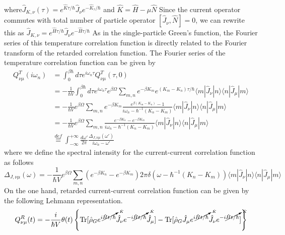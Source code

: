 where$\hat J_{K,\nu}(\tau)=e^{\hat{K}\tau/\hbar}\hat J_\nu e^{-\hat{K}_\tau/\hbar}$
and $\hat K=\hat H-\mu \hat N$
 Since the current operator commutes with total number of particle operator $[\hat J_\nu,\hat N]=0$, we can rewrite this as $\hat J_{K,\nu}=e^{\hat H\tau/\hbar}\hat J_\nu e^{-\hat H\tau/\hbar}$
 As in the single-particle Green's function, the Fourier series of this temperature correlation function is directly related to the Fourier transform of the retarded correlation function.
 The Fourier series of the temperature correlation function can be given by
\begin{equation}\label{eq4.8.19}
\begin{aligned}
Q^T_{\nu\mu}(i\omega_n)&=\int_0^{\beta\hbar} d\tau e^{i\omega_n \tau} Q^T_{\nu\mu}(\tau,0)\\
&=-\frac{1}{\hbar V} \int_0^{\beta\hbar} d\tau e^{i\omega_n \tau} e^{\beta\Omega} \sum_{m,n} e^{-\beta K_m} e^{(K_m-K_n)\tau/\hbar} \langle m|\hat J_\nu|n\rangle \langle n| \hat J_\mu|m\rangle\\
&=-\frac{1}{\hbar V} e^{\beta\Omega} \sum_{m,n} e^{-\beta K_m} \frac{e^{\beta(K_m-K_n)}-1}{i\omega_n-\hbar^{-1}(K_n-K_m)} \langle m|\hat J_\nu|n\rangle \langle n| \hat J_\mu|m\rangle\\
&=-\frac{1}{\hbar V} e^{\beta\Omega} \sum_{m,n} \frac{e^{-\beta K_n}-e^{-\beta K_m}}{i\omega_n-\hbar^{-1}(K_n-K_m)} \langle m|\hat J_\nu|n\rangle \langle n| \hat J_\mu|m\rangle\\
&\overset{def}{\equiv} \int_{-\infty}^{+\infty}\frac{d\omega'}{2\pi} \frac{\Delta_{J,\nu\mu}(\omega')}{i\omega_n-\omega'}
\end{aligned}
\end{equation}
where we define the spectral intensity for the current-current correlation function as follows
\begin{equation}
\Delta_{J,\nu\mu}(\omega)=-\frac{1}{\hbar V} e^{\beta\Omega} \sum_{m,n} \left( e^{-\beta K_n}-e^{-\beta K_m} \right) 2\pi \delta(\omega-\hbar^{-1}(K_n-K_m)) \langle m|\hat J_\nu|n\rangle \langle n| \hat J_\mu|m\rangle
\end{equation}
 On the one hand, retarded current-current correlation function can be given by the following Lehmann representation.
\begin{equation}
Q^R_{\nu\mu}(t)=-\frac{i}{\hbar V} \theta(t) \left\{ \text{Tr}[\hat \rho_G e^{i\cancelto{\hat K}{\hat Ht/\hbar}} \hat J_\nu e^{-i\cancelto{\hat K}{\hat Ht/\hbar}} \hat J_\mu]- \text{Tr}[\hat \rho_G \hat J_\mu e^{i\cancelto{\hat K}{\hat Ht/\hbar}} \hat J_\nu e^{-i\cancelto{\hat K}{\hat Ht/\hbar}} ] \right\}
\end{equation}
